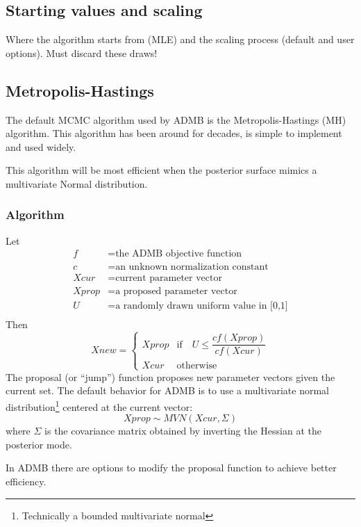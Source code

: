 \documentclass{article}\usepackage[]{graphicx}\usepackage[]{color}
\begin{document}
\subsection{Starting values and scaling}\label{sec:startvals}
Where the algorithm starts from (MLE) and the scaling process
(default and user options). Must discard these draws!
\subsection{Metropolis-Hastings}\label{sec:MH}
The default MCMC algorithm used by ADMB is the
Metropolis-Hastings (MH) algorithm. This algorithm has been
around for decades, is simple to implement and used widely.

This algorithm will be most efficient when the posterior
surface mimics a multivariate Normal distribution.

\subsubsection{Algorithm}
Let
\begin{align*}
  f&=\text{the ADMB objective function}\\
  c&=\text{an unknown normalization constant}\\
  Xcur&=\text{current parameter vector}\\
  Xprop&=\text{a proposed parameter vector}\\
  U&=\text{a randomly drawn uniform value in [0,1]}\\
\end{align*}
Then
\begin{equation}
  Xnew=
  \begin{cases}
    Xprop & \text{if} \quad U\leq \dfrac{cf(Xprop)}{cf(Xcur)}\\
    Xcur & \text{otherwise}
  \end{cases}
\end{equation}
The proposal (or ``jump'') function proposes new parameter
vectors given the current set. The default behavior for ADMB
is to use a multivariate normal
distribution\footnote{Technically a bounded multivariate
  normal} centered at the current vector:
\begin{equation*}
  Xprop\sim MVN(Xcur, \Sigma)
\end{equation*}
 where $\Sigma$ is the covariance matrix obtained by
 inverting the Hessian at the posterior mode.

In ADMB there are options to modify the proposal function to
achieve better efficiency.
\end{document}
